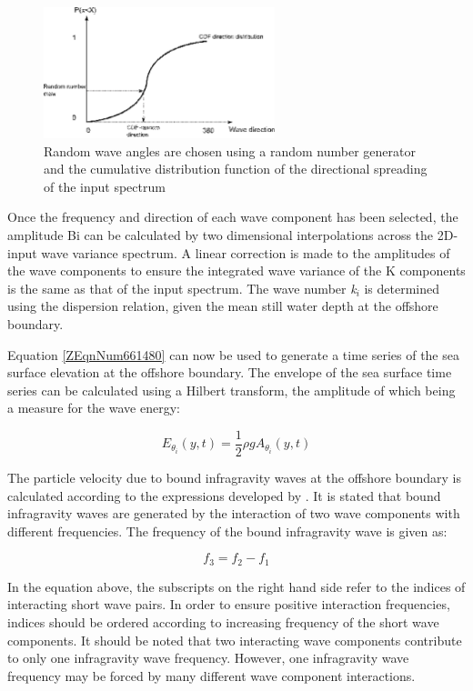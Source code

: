 \begin{figure}[h]
  \centering
  \includegraphics[width=0.6\textwidth]{image5} 
  \caption{Random wave angles are chosen using a random number generator and the cumulative distribution function of the directional spreading of the input spectrum}
  \label{fig:image5}
\end{figure}

Once the frequency and direction of each wave component has been selected, the amplitude Bi can be calculated by two dimensional interpolations across the 2D-input wave variance spectrum. A linear correction is made to the amplitudes of the wave components to ensure the integrated wave variance of the K components is the same as that of the input spectrum. The wave number \textit{k${}_{i}$} is determined using the dispersion relation, given the mean still water depth at the offshore boundary.

Equation \eqref{ZEqnNum661480} can now be used to generate a time series of the sea surface elevation at the offshore boundary. The envelope of the sea surface time series can be calculated using a Hilbert transform, the amplitude of which being a measure for the wave energy:

\begin{equation} \label{ZEqnNum899873} 
E_{\theta _{i} } \left(y,t\right)=\frac{1}{2} \rho gA_{\theta _{i} } \left(y,t\right) 
\end{equation} 

The particle velocity due to bound infragravity waves at the offshore boundary is calculated according to the expressions developed by \citet{Herbers1994}. It is stated that bound infragravity waves are generated by the interaction of two wave components with different frequencies. The frequency of the bound infragravity wave is given as:

\begin{equation} \label{2.23)} 
f_{3} =f_{2} -f_{1}  
\end{equation} 

In the equation above, the subscripts on the right hand side refer to the indices of interacting short wave pairs. In order to ensure positive interaction frequencies, indices should be ordered according to increasing frequency of the short wave components. It should be noted that two interacting wave components contribute to only one infragravity wave frequency. However, one infragravity wave frequency may be forced by many different wave component interactions.

